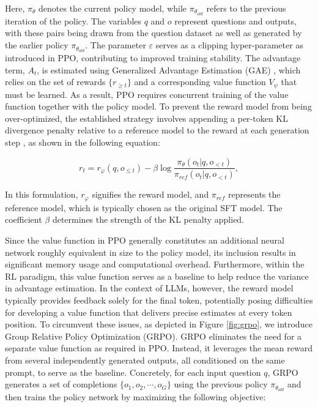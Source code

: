 \begin{itemize}[topsep=0pt]
\begin{itemize}[topsep=0pt]
Here, $\pi_{\theta}$ denotes the current policy model, while $\pi_{\theta_{old}}$ refers to the previous iteration of the policy. The variables $q$ and $o$ represent questions and outputs, with these pairs being drawn from the question dataset as well as generated by the earlier policy $\pi_{\theta_{old}}$. The parameter $\varepsilon$ serves as a clipping hyper-parameter as introduced in PPO, contributing to improved training stability. The advantage term, $A_t$, is estimated using Generalized Advantage Estimation (GAE) \citep{gae}, which relies on the set of rewards $\{r_{\ge t}\}$ and a corresponding value function $V_{\psi}$ that must be learned. As a result, PPO requires concurrent training of the value function together with the policy model. To prevent the reward model from being over-optimized, the established strategy involves appending a per-token KL divergence penalty relative to a reference model to the reward at each generation step \citep{ouyang2022training}, as shown in the following equation:

\begin{equation}
    r_{t} = r_\varphi(q, o_{\le t}) - \beta \log\frac{\pi_{\theta}(o_{t}|q, o_{<t})}{\pi_{ref}(o_{t}|q, o_{<t})},
\label{eq:PPO-reward}
\end{equation}

In this formulation, $r_\varphi$ signifies the reward model, and $\pi_{ref}$ represents the reference model, which is typically chosen as the original SFT model. The coefficient $\beta$ determines the strength of the KL penalty applied.

Since the value function in PPO generally constitutes an additional neural network roughly equivalent in size to the policy model, its inclusion results in significant memory usage and computational overhead. Furthermore, within the RL paradigm, this value function serves as a baseline to help reduce the variance in advantage estimation. In the context of LLMs, however, the reward model typically provides feedback solely for the final token, potentially posing difficulties for developing a value function that delivers precise estimates at every token position. To circumvent these issues, as depicted in Figure \ref{fig:grpo}, we introduce Group Relative Policy Optimization (GRPO). GRPO eliminates the need for a separate value function as required in PPO. Instead, it leverages the mean reward from several independently generated outputs, all conditioned on the same prompt, to serve as the baseline. Concretely, for each input question $q$, GRPO generates a set of completions $\{o_1, o_2, \cdots, o_G\}$ using the previous policy $\pi_{\theta_{old}}$ and then trains the policy network by maximizing the following objective:


\end{itemize}
\end{itemize}
